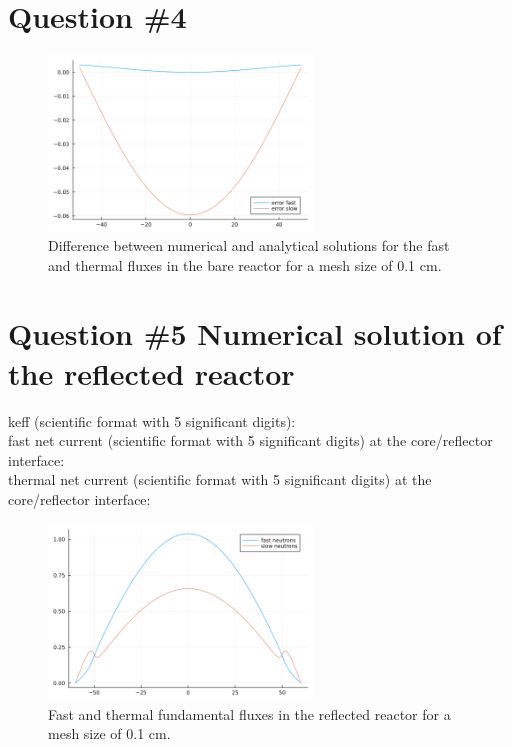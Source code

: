 \documentclass[11pt,a4paper]{article}
\begin{document}
\section{Question \#4}
\begin{figure}[h]
	\includegraphics[width=7cm]{../../figs/ex3/error.png}
	\centering
	\caption{Difference between numerical and analytical solutions for the fast and thermal fluxes in the bare reactor for a mesh size of 0.1 cm.}
\end{figure}

\section{Question \#5 Numerical solution of the reflected reactor}


keff (scientific format with 5 significant digits): \\

fast net current (scientific format with 5 significant digits) at the core/reflector interface: \\

thermal net current (scientific format with 5 significant digits) at the core/reflector interface: \\

\begin{figure}[h]
	\includegraphics[width=7cm]{../../figs/ex3/reflected.png}
	\centering
	\caption{Fast and thermal fundamental fluxes in the reflected reactor for a mesh size of 0.1 cm.}
\end{figure}
\end{document}
